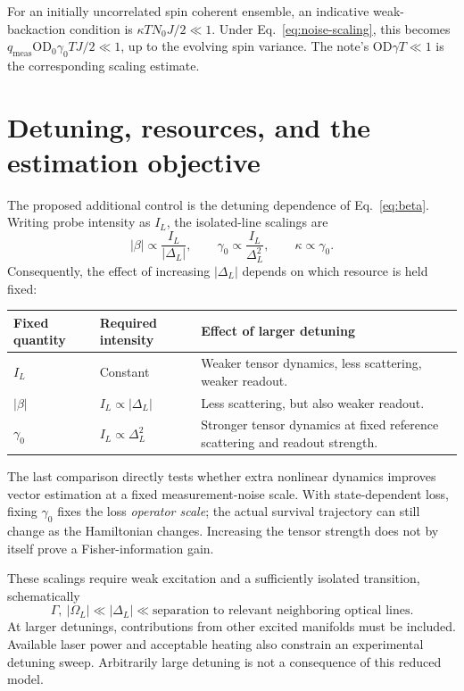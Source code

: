 \documentclass[11pt,letterpaper]{article}
\newcommand{\OD}{\mathrm{OD}}
\begin{document}
For an initially uncorrelated spin coherent ensemble, an indicative
weak-backaction condition is
$\kappa T N_0 J/2\ll1$. Under Eq.~\eqref{eq:noise-scaling}, this becomes
$q_{\mathrm{meas}}\OD_0\gamma_0 T J/2\ll1$, up to the evolving spin variance.
The note's $\OD\gamma T\ll1$ is the corresponding scaling estimate.

\newpage
\section{Detuning, resources, and the estimation objective}

The proposed additional control is the detuning dependence of
Eq.~\eqref{eq:beta}. Writing probe intensity as $I_L$, the isolated-line
scalings are
\begin{equation}
|\beta|\propto\frac{I_L}{|\Delta_L|},\qquad
\gamma_0\propto\frac{I_L}{\Delta_L^2},\qquad
\kappa\propto\gamma_0.
\end{equation}
Consequently, the effect of increasing $|\Delta_L|$ depends on which resource
is held fixed:
\begin{center}
\begin{tabularx}{\textwidth}{@{}lYY@{}}
\toprule
Fixed quantity & Required intensity & Effect of larger detuning\\
\midrule
$I_L$ & Constant & Weaker tensor dynamics, less scattering, weaker readout.\\
$|\beta|$ & $I_L\propto|\Delta_L|$ & Less scattering, but also weaker readout.\\
$\gamma_0$ & $I_L\propto\Delta_L^2$ & Stronger tensor dynamics at fixed reference scattering and readout strength.\\
\bottomrule
\end{tabularx}
\end{center}

The last comparison directly tests whether extra nonlinear dynamics improves
vector estimation at a fixed measurement-noise scale. With state-dependent
loss, fixing $\gamma_0$ fixes the loss \emph{operator scale}; the actual
survival trajectory can still change as the Hamiltonian changes. Increasing
the tensor strength does not by itself prove a Fisher-information gain.

These scalings require weak excitation and a sufficiently isolated transition,
schematically
\begin{equation}
\Gamma,\ |\Omega_L|\ll|\Delta_L|
\ll\text{separation to relevant neighboring optical lines}.
\end{equation}
At larger detunings, contributions from other excited manifolds must be
included. Available laser power and acceptable heating also constrain an
experimental detuning sweep. Arbitrarily large detuning is not a consequence
of this reduced model.
\end{document}
